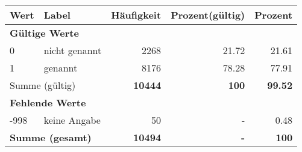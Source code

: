      \begin{longtable}{lXrrr}
     \toprule
     \textbf{Wert} & \textbf{Label} & \textbf{Häufigkeit} & \textbf{Prozent(gültig)} & \textbf{Prozent} \\
     \endhead
     \midrule
     \multicolumn{5}{l}{\textbf{Gültige Werte}}\\

     0 &
     \multicolumn{1}{X}{ nicht genannt   } &


       \num{2268} &
       \num[round-mode=places,round-precision=2]{21.72} &
         \num[round-mode=places,round-precision=2]{21.61} \\

     1 &
     \multicolumn{1}{X}{ genannt   } &


       \num{8176} &
       \num[round-mode=places,round-precision=2]{78.28} &
         \num[round-mode=places,round-precision=2]{77.91} \\
     \midrule
     \multicolumn{2}{l}{Summe (gültig)} &
       \textbf{\num{10444}} &
     \textbf{\num{100}} &
       \textbf{\num[round-mode=places,round-precision=2]{99.52}} \\
     \multicolumn{5}{l}{\textbf{Fehlende Werte}}\\
       -998 &
       keine Angabe &
         \num{50} &
        - &
         \num[round-mode=places,round-precision=2]{0.48} \\
     \midrule
     \multicolumn{2}{l}{\textbf{Summe (gesamt)}} &
          \textbf{\num{10494}} &
        \textbf{-} &
        \textbf{\num{100}} \\
     \bottomrule
     \end{longtable}
     
